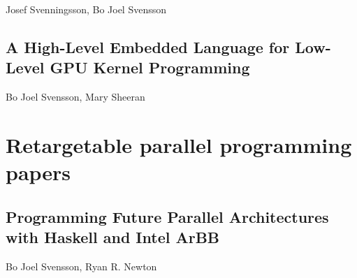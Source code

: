 \documentclass[a4paper]{book}
\begin{document}
\begin{center} 
Josef Svenningsson, Bo Joel Svensson
\end{center}




% 
\cleardoublepage 


\section{A High-Level Embedded Language for Low-Level GPU Kernel Programming}
\label{sec:paper6}

\begin{center} 
Bo Joel Svensson, Mary Sheeran
\end{center}






% 

\chapter{Retargetable parallel programming papers}
% 
\cleardoublepage 


\section{Programming Future Parallel Architectures with Haskell and Intel ArBB}
\label{sec:paper7}

\begin{center} 
Bo Joel Svensson, Ryan R. Newton
\end{center}




% 
\cleardoublepage 
\end{document}
